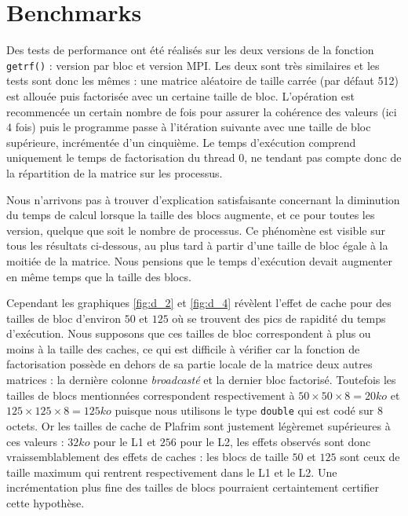 \section{Benchmarks}

Des tests de performance ont été réalisés sur les deux versions de la fonction \texttt{getrf()} : version par bloc et version MPI. Les deux sont très similaires et les tests sont donc les mêmes : une matrice aléatoire de taille carrée (par défaut 512) est allouée puis factorisée avec un certaine taille de bloc. L'opération est recommencée un certain nombre de fois pour assurer la cohérence des valeurs (ici $4$ fois) puis le programme passe à l'itération suivante avec une taille de bloc supérieure, incrémentée d'un cinquième. Le temps d'exécution comprend uniquement le temps de factorisation du thread $0$, ne tendant pas compte donc de la répartition de la matrice sur les processus.

Nous n'arrivons pas à trouver d'explication satisfaisante concernant la diminution du temps de calcul lorsque la taille des blocs augmente, et ce pour toutes les version, quelque que soit le nombre de processus. Ce phénomène est visible sur tous les résultats ci-dessous, au plus tard à partir d'une taille de bloc égale à la moitiée de la matrice. Nous pensions que le temps d'exécution devait augmenter en même temps que la taille des blocs.

Cependant les graphiques \ref{fig:d_2} et \ref{fig:d_4} révèlent l'effet de cache pour des tailles de bloc d'environ $50$ et $125$ où se trouvent des pics de rapidité du temps d'exécution. Nous supposons que ces tailles de bloc correspondent à plus ou moins à la taille des caches, ce qui est difficile à vérifier car la fonction de factorisation possède en dehors de sa partie locale de la matrice deux autres matrices : la dernière colonne \emph{broadcasté} et la dernier bloc factorisé. Toutefois les tailles de blocs mentionnées correspondent respectivement à $50 \times 50 \times 8 = 20 ko$ et $125 \times 125 \times 8 = 125 ko$ puisque nous utilisons le type \texttt{double} qui est codé sur $8$ octets. Or les tailles de cache de Plafrim sont justement légèremet supérieures à ces valeurs : $32 ko$ pour le L1 et $256$ pour le L2, les effets observés sont donc vraissemblablement des effets de caches : les blocs de taille $50$ et $125$ sont ceux de taille maximum qui rentrent respectivement dans le L1 et le L2. Une incrémentation plus fine des tailles de blocs pourraient certaintement certifier cette hypothèse.

